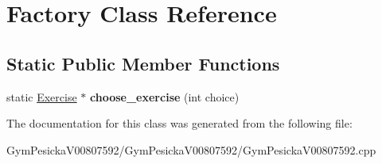 \hypertarget{class_factory}{}\section{Factory Class Reference}
\label{class_factory}
\subsection*{Static Public Member Functions}
\begin{DoxyCompactItemize}
\item 
\hypertarget{class_factory_a68c8c516bcfdd5639b08e84967d856ea}{}static \hyperlink{class_exercise}{Exercise} $\ast$ {\bfseries choose\+\_\+exercise} (int choice)\label{class_factory_a68c8c516bcfdd5639b08e84967d856ea}

\end{DoxyCompactItemize}


The documentation for this class was generated from the following file\+:\begin{DoxyCompactItemize}
\item 
Gym\+Pesicka\+V00807592/\+Gym\+Pesicka\+V00807592/Gym\+Pesicka\+V00807592.\+cpp\end{DoxyCompactItemize}
